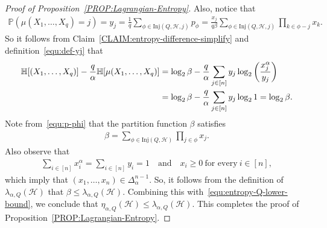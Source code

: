 \documentclass[11pt,a4paper]{article}
\begin{document}
\begin{proof}[Proof of Proposition~\ref{PROP:Lagrangian-Entropy}]
    Also, notice that 
    \begin{align*}
        \mathbb{P}\left(\mu(X_1, \ldots, X_q) = j \right) 
        = y_j 
        = \frac{1}{q}\sum_{\phi \in \mathrm{Inj}(Q,\mathcal{H}, j)}p_{\phi}
        = \frac{x_j}{q \beta}  \sum_{\phi \in \mathrm{Inj}(Q,\mathcal{H}, j)} \prod_{k \in \phi - j} x_k.
    \end{align*}
    So it follows from Claim~\ref{CLAIM:entropy-difference-simplify} and definition~\eqref{equ:def-yj} that 
    \begin{align}\label{equ:entropy-Q-lower-bound}
        \mathbb{H}[(X_1, \ldots, X_{q})] - \frac{q}{\alpha} \mathbb{H}[\mu(X_1, \ldots, X_q)] 
        & = \log_{2} \beta - \frac{q}{\alpha} \sum_{j \in [n]} y_j \log_{2}\left(\frac{x_j^{\alpha}}{y_j}\right) \notag \\
        & = \log_{2} \beta - \frac{q}{\alpha} \sum_{j \in [n]} y_j \log_{2} 1
        = \log_{2} \beta.  
    \end{align}
    Note from~\eqref{equ:p-phi} that the partition function $\beta$ satisfies 
    \begin{align*}
        \beta 
        = \sum_{\phi \in \mathrm{Inj}(Q, \mathcal{H})} \prod_{j \in \phi} x_j. 
    \end{align*}
    Also observe that  
    \begin{align*}
        \sum_{i\in [n]} x_i^{\alpha} = \sum_{i \in [n]} y_i = 1
        \quad\text{and}\quad 
        x_i \ge 0 ~\text{for every}~ i \in [n], 
    \end{align*}
    which imply that $(x_1, \ldots, x_n) \in \Delta_{\alpha}^{n-1}$. 
    So, it follows from the definition of $\lambda_{\alpha, Q}(\mathcal{H})$ that $\beta \le \lambda_{\alpha, Q}(\mathcal{H})$. 
    Combining this with~\eqref{equ:entropy-Q-lower-bound}, we conclude that $\eta_{\alpha, Q}(\mathcal{H}) \le \lambda_{\alpha, Q}(\mathcal{H})$. 
    This completes the proof of Proposition~\ref{PROP:Lagrangian-Entropy}. 
\end{proof}%

\end{document}
